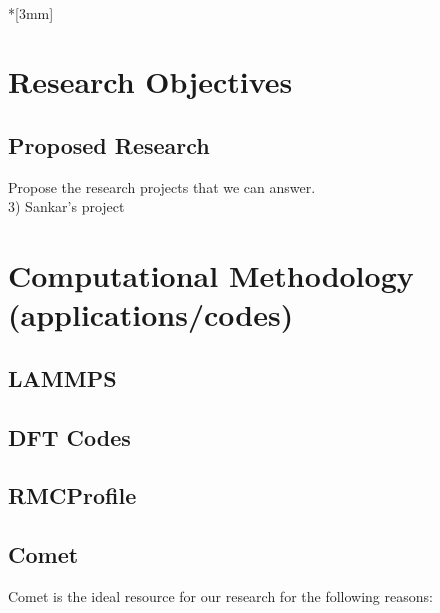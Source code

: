 \documentclass{proposalnsf}
\begin{document}
\\*[3mm]

\renewcommand{\thepage} {\arabic{page}}



\section*{Research Objectives}


\subsection*{Proposed Research}






Propose the research projects that we can answer.  \\
  3) Sankar's project \\





\section*{Computational Methodology (applications/codes)}
\subsection*{LAMMPS}


\subsection*{DFT Codes}


\subsection*{RMCProfile}


\subsection*{Comet}
Comet is the ideal resource for our research for the following reasons:
\end{document}
